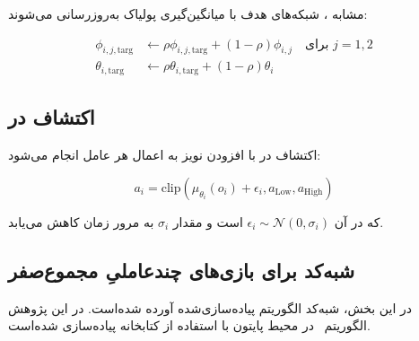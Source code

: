 مشابه ، شبکه‌های هدف با میانگین‌گیری پولیاک به‌روزرسانی می‌شوند:

\begin{align*}
    \phi_{i,j,\text{targ}} &\leftarrow \rho \phi_{i,j,\text{targ}} + (1 - \rho) \phi_{i,j} \quad \text{برای } j=1,2 \\
    \theta_{i,\text{targ}} &\leftarrow \rho \theta_{i,\text{targ}} + (1 - \rho) \theta_i
\end{align*}

\subsection{اکتشاف در }

اکتشاف در  با افزودن نویز به اعمال هر عامل انجام می‌شود:

\begin{equation}
    a_i = \text{clip}(\mu_{\theta_i}(o_i) + \epsilon_i, a_{\text{Low}}, a_{\text{High}})
\end{equation}

که در آن $\epsilon_i \sim \mathcal{N}(0, \sigma_i)$ است و مقدار $\sigma_i$ به مرور زمان کاهش می‌یابد.

\subsection{شبه‌کد  برای بازی‌های چندعاملیِ مجموع­‌صفر}

در این بخش، شبه‌کد الگوریتم  پیاده‌سازی‌شده آورده شده‌است. در این پژوهش الگوریتم~ در محیط پایتون با استفاده از کتابخانه  \cite{paszke2017automatic} پیاده‌سازی شده‌است.

